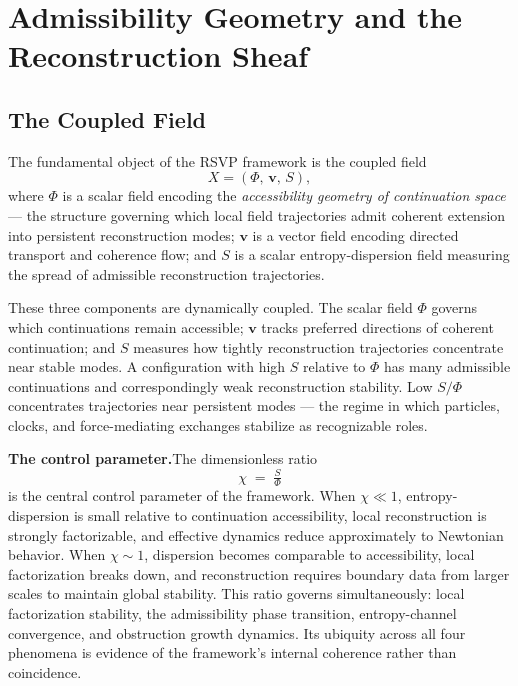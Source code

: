 \documentclass[11pt, a4paper]{article}
\theoremstyle{plain}
\theoremstyle{definition}
\theoremstyle{remark}
\newcommand{\Xfield}{X = (\Phi,\,\mathbf{v},\,S)}
\newcommand{\ctrl}{\tfrac{S}{\Phi}}
\begin{document}
\section{Admissibility Geometry and the Reconstruction Sheaf}
\label{sec:geometry}

\subsection{The Coupled Field}

The fundamental object of the RSVP framework is the coupled field
\begin{equation}
  \Xfield,
\end{equation}
where $\Phi$ is a scalar field encoding the \emph{accessibility geometry of
continuation space} --- the structure governing which local field trajectories admit
coherent extension into persistent reconstruction modes; $\mathbf{v}$ is a vector
field encoding directed transport and coherence flow; and $S$ is a scalar
entropy-dispersion field measuring the spread of admissible reconstruction
trajectories.

These three components are dynamically coupled. The scalar field $\Phi$ governs
which continuations remain accessible; $\mathbf{v}$ tracks preferred directions of
coherent continuation; and $S$ measures how tightly reconstruction trajectories
concentrate near stable modes. A configuration with high $S$ relative to $\Phi$ has
many admissible continuations and correspondingly weak reconstruction stability. Low
$S/\Phi$ concentrates trajectories near persistent modes --- the regime in which
particles, clocks, and force-mediating exchanges stabilize as recognizable roles.

\medskip
\noindent\textbf{The control parameter.}\quad The dimensionless ratio
\begin{equation}
  \label{eq:control}
  \chi \;=\; \ctrl
\end{equation}
is the central control parameter of the framework. When $\chi \ll 1$,
entropy-dispersion is small relative to continuation accessibility, local
reconstruction is strongly factorizable, and effective dynamics reduce approximately
to Newtonian behavior. When $\chi \sim 1$, dispersion becomes comparable to
accessibility, local factorization breaks down, and reconstruction requires boundary
data from larger scales to maintain global stability. This ratio governs
simultaneously: local factorization stability, the admissibility phase transition,
entropy-channel convergence, and obstruction growth dynamics. Its ubiquity across all
four phenomena is evidence of the framework's internal coherence rather than
coincidence.
\end{document}
